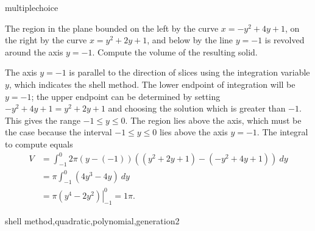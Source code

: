 \documentclass{ximera}
\begin{document}
\begin{question}[ShellQuad019]
\begin{type}
multiplechoice
\end{type}
The region in the plane bounded on the left by the curve \(x=-y^2+4y+1\), on the right by the curve \(x=y^2+2y+1\), and below by the line \(y = -1\) is revolved around the axis \(y = -1\). Compute the volume of the resulting solid.
\begin{multiplechoice}
\choice[correct]{\(\pi\)}
\choice{\(5\pi\)}
\choice{\(9\pi\)}
\choice{\(13\pi\)}
\choice{\(17\pi\)}
\choice{\(21\pi\)}
\end{multiplechoice}
\begin{feedback}
The axis \(y = -1\) is parallel to the direction of slices using the integration variable \(y\), which indicates the shell method. The lower endpoint of integration will be \(y = -1\); the upper endpoint can be determined by setting \(-y^2+4y+1 = y^2+2y+1\) and choosing the solution which is greater than \(-1\). This gives the range \(-1 \leq y \leq 0\). 
 The region lies above the axis, which must be the case because the interval \(-1 \leq y \leq 0\) lies above the axis \(y = -1\).
The integral to compute equals \[ \begin{aligned} V &= \int_{-1}^{0}2 \pi (y-(-1))((y^2+2y+1)-(-y^2+4y+1))~ dy\\
& = \pi \int_{-1}^{0} (4y^3-4y)~ dy\\
& = \pi \left. \left(y^4-2y^2\right) \right|_{-1}^{0} = 1\pi. \end{aligned}\]
\end{feedback}
\begin{keywords}
shell method,quadratic,polynomial,generation2
\end{keywords}
\end{question}
\end{document}
